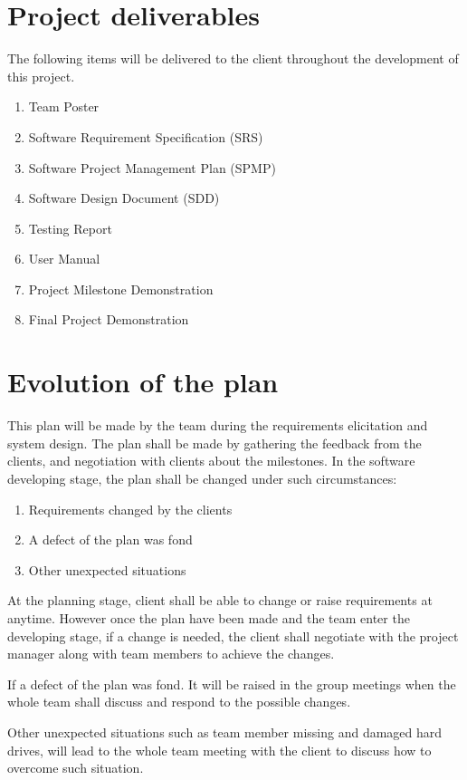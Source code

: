 \documentclass[11pt, a4paper]{report}
\begin{document}
\section{Project deliverables}
The following items will be delivered to the client throughout the development of this project.
\begin{enumerate}
	\item Team Poster
	\item Software Requirement Specification (SRS)
	\item Software Project Management Plan (SPMP)
	\item Software Design Document (SDD)
	\item Testing Report
	\item User Manual
	\item Project Milestone Demonstration
	\item Final Project Demonstration
\end{enumerate}


\section{Evolution of the plan}
This plan will be made by the team during the requirements elicitation and system design. The plan shall be made by gathering the feedback from the clients, and negotiation with clients about the milestones. In the software developing stage, the plan shall be changed under such circumstances:
\begin{enumerate}
	\item Requirements changed by the clients
	\item A defect of the plan was fond
	\item Other unexpected situations
\end{enumerate}

At the planning stage, client shall be able to change or raise requirements at anytime. However once the plan have been made and the team enter the developing stage, if a change is needed, the client shall negotiate with the project manager along with team members to achieve the changes. 

If a defect of the plan was fond. It will be raised in the group meetings when the whole team shall discuss and respond to the possible changes.

Other unexpected situations such as team member missing and damaged hard drives, will lead to the whole team meeting with the client to discuss how to overcome such situation. 
\end{document}
